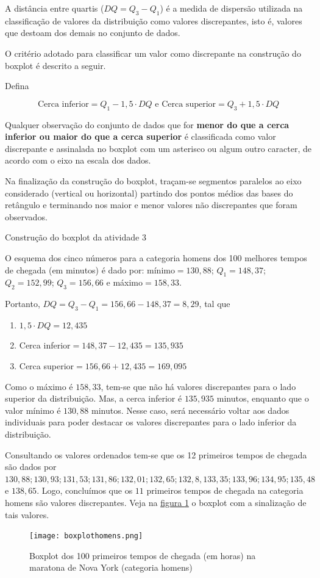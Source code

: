 A distância entre quartis ($DQ=Q_3-Q_1$) é a medida de dispersão utilizada na classificação de valores da distribuição como valores discrepantes, isto é, valores que destoam dos demais no conjunto de dados.

O critério adotado para classificar um valor como discrepante na construção do boxplot é descrito a seguir.

Defina

\begin{equation*}
\text{Cerca inferior}=Q_1-1{,}5\cdot DQ \text{ e Cerca superior} = Q_3+1{,}5\cdot{DQ}
\end{equation*}

Qualquer observação do conjunto de dados que for \textbf{menor do que a cerca inferior ou maior do que a cerca superior} é classificada como valor discrepante e assinalada no boxplot com um asterisco ou algum outro caracter, de acordo com o eixo na escala dos dados.

Na finalização da construção do boxplot, traçam-se segmentos paralelos ao eixo considerado (vertical ou horizontal) partindo dos pontos médios das bases do retângulo e terminando nos maior e menor valores não discrepantes que foram observados.

\begin{example}{Construção do boxplot da atividade 3}

O esquema dos cinco números para a categoria homens dos 100 melhores tempos de chegada (em minutos) é dado por: mínimo$=130{,}88$; $Q_1=148{,}37$; $Q_2=152{,}99$; $Q_3=156{,}66$ e máximo$=158{,}33$.

Portanto, $DQ=Q_3-Q_1=156{,}66-148{,}37=8{,}29$, tal que
\begin{enumerate}
\item $1{,}5\cdot DQ=12{,}435$
\item Cerca inferior$=148{,}37-12{,}435=135{,}935$
\item Cerca superior$=156{,}66+12{,}435=169{,}095$
\end{enumerate}


Como o máximo é $158{,}33$, tem-se que não há valores discrepantes para o lado superior da distribuição. Mas, a cerca inferior é $135{,}935$ minutos, enquanto que o valor mínimo é $130{,}88$ minutos. Nesse caso, será necessário voltar aos dados individuais para poder destacar os valores discrepantes para o lado inferior da distribuição.

Consultando os valores ordenados tem-se que os 12 primeiros tempos de chegada são dados por $130{,}88; 130{,}93; 131{,}53; 131{,}86; 132{,}01; 132{,}65; 132{,}8, 133{,}35; 133{,}96; 134{,}95; 135{,}48$ e $138{,}65$. Logo, concluímos que os $11$ primeiros tempos de chegada na categoria homens são valores discrepantes. Veja na \hyperref[boxplothomens]{figura \ref{boxplothomens}} o boxplot com a sinalização de tais valores.

\begin{figure}[H]
\centering

\texttt{[image: boxplothomens.png]}
\caption{Boxplot dos 100 primeiros tempos de chegada (em horas) na maratona de Nova York (categoria homens)}
\label{boxplothomens}
\end{figure}
\end{example}

